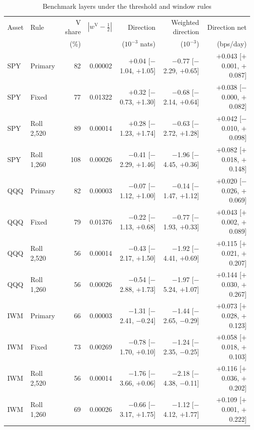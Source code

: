 \begin{table}[!htbp]\centering\footnotesize\setlength{\tabcolsep}{2pt}
\caption{Benchmark layers under the threshold and window rules}\label{tab:layerrules}
\begin{tabular}{llrrrrr}\toprule
Asset & Rule & V share & $|w^{\mathrm V}-\tfrac12|$ & Direction & Weighted direction & Direction net\\
 & & (\%) & & ($10^{-3}$ nats) & ($10^{-3}$) & (bps/day)\\\midrule
SPY & Primary & 82 & 0.00002 & $+$0.04 [$-$1.04, $+$1.05] & $-$0.77 [$-$2.29, $+$0.65] & $+$0.043 [$+$0.001, $+$0.087]\\
SPY & Fixed & 77 & 0.01322 & $+$0.32 [$-$0.73, $+$1.30] & $-$0.68 [$-$2.14, $+$0.64] & $+$0.038 [$-$0.000, $+$0.082]\\
SPY & Roll 2,520 & 89 & 0.00014 & $+$0.28 [$-$1.23, $+$1.74] & $-$0.63 [$-$2.72, $+$1.28] & $+$0.042 [$-$0.010, $+$0.098]\\
SPY & Roll 1,260 & 108 & 0.00026 & $-$0.41 [$-$2.29, $+$1.46] & $-$1.96 [$-$4.45, $+$0.36] & $+$0.082 [$+$0.018, $+$0.148]\\
\midrule
QQQ & Primary & 82 & 0.00003 & $-$0.07 [$-$1.12, $+$1.00] & $-$0.14 [$-$1.47, $+$1.12] & $+$0.020 [$-$0.026, $+$0.069]\\
QQQ & Fixed & 79 & 0.01376 & $-$0.22 [$-$1.13, $+$0.68] & $-$0.77 [$-$1.93, $+$0.33] & $+$0.043 [$+$0.002, $+$0.089]\\
QQQ & Roll 2,520 & 56 & 0.00014 & $-$0.43 [$-$2.17, $+$1.50] & $-$1.92 [$-$4.41, $+$0.69] & $+$0.115 [$+$0.021, $+$0.207]\\
QQQ & Roll 1,260 & 56 & 0.00026 & $-$0.54 [$-$2.88, $+$1.73] & $-$1.97 [$-$5.24, $+$1.07] & $+$0.144 [$+$0.030, $+$0.267]\\
\midrule
IWM & Primary & 66 & 0.00003 & $-$1.31 [$-$2.41, $-$0.24] & $-$1.44 [$-$2.65, $-$0.29] & $+$0.073 [$+$0.028, $+$0.123]\\
IWM & Fixed & 73 & 0.00269 & $-$0.78 [$-$1.70, $+$0.10] & $-$1.24 [$-$2.35, $-$0.25] & $+$0.058 [$+$0.018, $+$0.103]\\
IWM & Roll 2,520 & 56 & 0.00014 & $-$1.76 [$-$3.66, $+$0.06] & $-$2.18 [$-$4.38, $-$0.11] & $+$0.116 [$+$0.036, $+$0.202]\\
IWM & Roll 1,260 & 69 & 0.00026 & $-$0.66 [$-$3.17, $+$1.75] & $-$1.12 [$-$4.12, $+$1.77] & $+$0.109 [$+$0.001, $+$0.222]\\
\bottomrule\end{tabular}

\end{table}
